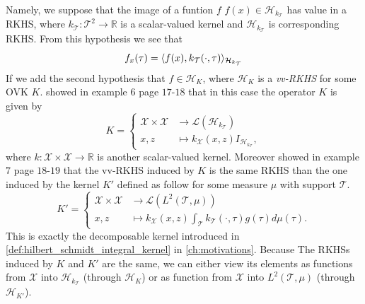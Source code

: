 \paragraph{}
Namely, we suppose that the image of a funtion $f$ $f(x) \in
\mathcal{H}_{k_{\mathcal{T}}}$ has value in a \acs{RKHS}, where
$k_{\mathcal{T}}:\mathcal{T}^2\to\mathbb{R}$ is a scalar-valued kernel and
$\mathcal{H}_{k_{\mathcal{T}}}$ is corresponding \acs{RKHS}. From this
hypothesis we see that
\begin{dmath*}
    f_x(\tau) = \inner{f(x), k_{\mathcal{T}}(\cdot,
    \tau)}_{\mathcal{H}_{k_{\mathcal{T}}}}
\end{dmath*}
If we add the second hypothesis that $f\in\mathcal{H}_K$, where $\mathcal{H}_K$
is a \emph{\acl{vv-RKHS}} for some \acl{OVK} $K$.  showed in
example $6$ page $17$-$18$ that in this case the operator $K$ is given by
\begin{dmath}
    \label{eq:functional_kernel}
    K =
    \begin{cases}
        \mathcal{X} \times \mathcal{X} & \to
        \mathcal{L}(\mathcal{H}_{k_{\mathcal{T}}}) \\
        x, z & \mapsto k_{\mathcal{X}}(x, z) I_{\mathcal{H}_{k_{\mathcal{T}}}},
    \end{cases}
\end{dmath}
where $k:\mathcal{X}\times\mathcal{X} \to \mathbb{R}$ is another scalar-valued
kernel. Moreover \citet{Carmeli2010} showed in example $7$ page $18$-$19$ that
the \acs{vv-RKHS} induced by $K$ is the same \acs{RKHS} than the one induced by
the kernel $K'$ defined as follow for some measure $\mu$ with support
$\mathcal{T}$.
\begin{dmath*}
    K' =
    \begin{cases}
        \mathcal{X} \times \mathcal{X} & \to
        \mathcal{L}\left(L^2(\mathcal{T}, \mu)\right) \\
        x, z & \mapsto k_{\mathcal{X}}(x, z)
        \int_{\mathcal{T}}k_{\mathcal{T}}(\cdot, \tau)g(\tau)d\mu(\tau).
    \end{cases}
\end{dmath*}
This is exactly the decomposable kernel introduced in
\cref{def:hilbert_schmidt_integral_kernel} in \cref{ch:motivations}. Because
The \acsp{RKHS} induced by $K$ and $K'$ are the same, we can either view its
elements as functions from $\mathcal{X}$ into $\mathcal{H}_{k_{\mathcal{T}}}$
(through $\mathcal{H}_K$) or as function from $\mathcal{X}$ into
$L^2(\mathcal{T}, \mu)$ (through $\mathcal{H}_{K'}$).

